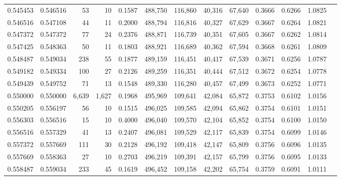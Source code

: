 \begin{tabular}{rrrrrrrrrrrrr}
0.545453 & 0.546516 &     53 &    10 &                                     0.1587 & 488,750 & 116,860 &  40,316 &  67,640 & 0.3666 & 0.6266 & 1.0825 \\
0.546516 & 0.547108 &     44 &    11 &                                     0.2000 & 488,794 & 116,816 &  40,327 &  67,629 & 0.3667 & 0.6264 & 1.0821 \\
0.547372 & 0.547372 &     77 &    24 &                                     0.2376 & 488,871 & 116,739 &  40,351 &  67,605 & 0.3667 & 0.6262 & 1.0814 \\
0.547425 & 0.548363 &     50 &    11 &                                     0.1803 & 488,921 & 116,689 &  40,362 &  67,594 & 0.3668 & 0.6261 & 1.0809 \\
0.548487 & 0.549034 &    238 &    55 &                                     0.1877 & 489,159 & 116,451 &  40,417 &  67,539 & 0.3671 & 0.6256 & 1.0787 \\
0.549182 & 0.549334 &    100 &    27 &                                     0.2126 & 489,259 & 116,351 &  40,444 &  67,512 & 0.3672 & 0.6254 & 1.0778 \\
0.549439 & 0.549752 &     71 &    13 &                                     0.1548 & 489,330 & 116,280 &  40,457 &  67,499 & 0.3673 & 0.6252 & 1.0771 \\
0.550000 & 0.550000 &  6,639 & 1,627 &                                     0.1968 & 495,969 & 109,641 &  42,084 &  65,872 & 0.3753 & 0.6102 & 1.0156 \\
0.550205 & 0.556197 &     56 &    10 &                                     0.1515 & 496,025 & 109,585 &  42,094 &  65,862 & 0.3754 & 0.6101 & 1.0151 \\
0.556303 & 0.556516 &     15 &    10 &                                     0.4000 & 496,040 & 109,570 &  42,104 &  65,852 & 0.3754 & 0.6100 & 1.0150 \\
0.556516 & 0.557329 &     41 &    13 &                                     0.2407 & 496,081 & 109,529 &  42,117 &  65,839 & 0.3754 & 0.6099 & 1.0146 \\
0.557372 & 0.557669 &    111 &    30 &                                     0.2128 & 496,192 & 109,418 &  42,147 &  65,809 & 0.3756 & 0.6096 & 1.0135 \\
0.557669 & 0.558363 &     27 &    10 &                                     0.2703 & 496,219 & 109,391 &  42,157 &  65,799 & 0.3756 & 0.6095 & 1.0133 \\
0.558487 & 0.559034 &    233 &    45 &                                     0.1619 & 496,452 & 109,158 &  42,202 &  65,754 & 0.3759 & 0.6091 & 1.0111 \\

\end{tabular}
